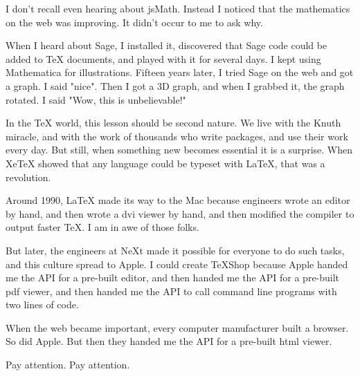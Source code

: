 \documentclass[11pt, oneside]{article}   	%
\begin{document}
I don't recall even hearing about jsMath. Instead I noticed that the mathematics on the web was improving. It didn't occur to me to ask why. 

When I heard about Sage, I installed it, discovered that Sage code could be added to TeX documents, and played with it for several days.  I kept using Mathematica for  illustrations. Fifteen years later, I tried Sage on the web and got a graph. I said "nice". Then I got a 3D graph, and when I grabbed it, the graph rotated. I said
"Wow, this is unbelievable!"

In the TeX world, this lesson should be second nature. We live with the Knuth miracle, and with the work of thousands who write packages, and use their work every day. But still, when something new becomes essential it is a surprise. When XeTeX showed that any language could be typeset with LaTeX, that was a revolution.

Around 1990, LaTeX made its way to the Mac because engineers wrote an editor by hand, and then wrote a dvi viewer by hand, and then  modified the compiler to output faster TeX.  I am in awe of those folks. 

But later, the engineers at NeXt made it possible for everyone to do such tasks, and this culture spread to Apple. I could create TeXShop because Apple handed me the API for a pre-built editor, and then handed me the API for a pre-built pdf viewer, and then handed me the API to call command line programs with two lines of code. 

When the web became important, every computer manufacturer built a browser. So did Apple. But then they handed me the API for a pre-built html viewer. 

Pay attention. Pay attention.
\end{document}
